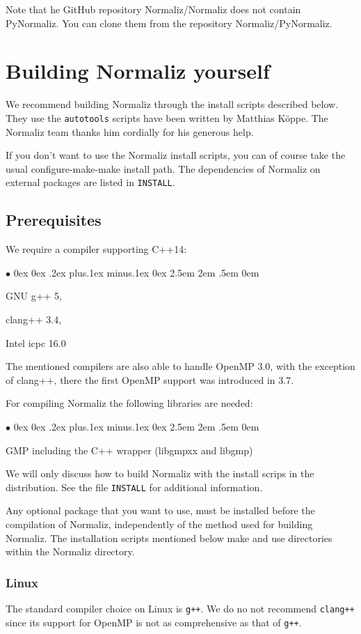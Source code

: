 \documentclass[12pt,a4paper]{scrartcl}
\newcommand{\stdli}{ \topsep0ex \partopsep0ex %
\parsep.2ex plus.1ex minus.1ex \itemsep0ex%
\leftmargin2.5em \labelwidth2em \labelsep.5em \rightmargin0em}%
\renewenvironment{itemize}{\begin{list}{{$\bullet$}}{\stdli}}{\end{list}}
\theoremstyle{definition}
\begin{document}
Note that he GitHub repository Normaliz/Normaliz does not contain PyNormaliz. You can clone them from the repository Normaliz/PyNormaliz.

\section{Building Normaliz yourself}\label{Compile}

We recommend building Normaliz through the install scripts described below. They use the \verb|autotools| scripts have been written by Matthias K\"oppe. The Normaliz team thanks him cordially for his generous help.

If you don't want to use the Normaliz install scripts, you can of course take the usual configure-make-make install path. The dependencies of Normaliz on external packages are listed in \verb|INSTALL|.

\subsection{Prerequisites}

We require a compiler supporting C++14:
\begin{itemize}
	\item GNU g++ 5,
	\item clang++ 3.4,
	\item Intel icpc 16.0
\end{itemize}
The mentioned compilers are also able to handle OpenMP 3.0, with the exception of clang++, there the first OpenMP support was introduced in 3.7.

For compiling Normaliz the following libraries are needed:
\begin{itemize}
	\item GMP including the C++ wrapper (libgmpxx and libgmp)
\end{itemize}

We will only discuss how to build Normaliz with the install scrips in the distribution. See the file \verb|INSTALL| for additional information. 

Any optional package that you want to use, must be installed before the compilation of Normaliz, independently of the method used for building Normaliz. The installation scripts mentioned below make and use directories within the Normaliz directory.

\subsubsection{Linux}
The standard compiler choice on Linux is \verb|g++|. We do no not recommend \verb|clang++| since its support for OpenMP is not as comprehensive as that of \verb|g++|.
\end{document}
